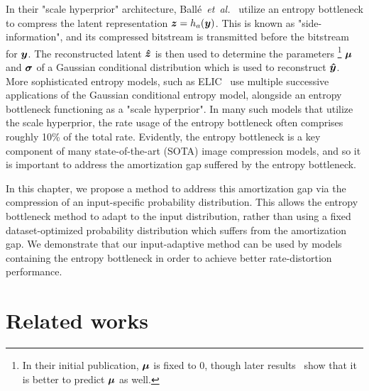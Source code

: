 In their "scale hyperprior" architecture, Ballé~\emph{et~al.}~\cite{balle2018variational} utilize an entropy bottleneck to compress the latent representation ${\boldsymbol{z}} = h_a({\boldsymbol{y}})$.
This is known as "side-information", and its compressed bitstream is transmitted before the bitstream for ${\boldsymbol{y}}$.
The reconstructed latent ${\boldsymbol{\hat{z}}}$ is then used to determine the parameters%
\footnote{In their initial publication, ${\boldsymbol{\mu}}$ is fixed to $0$, though later results~\cite{minnen2018joint} show that it is better to predict ${\boldsymbol{\mu}}$ as well.}
${\boldsymbol{\mu}}$ and ${\boldsymbol{\sigma}}$ of a Gaussian conditional distribution which is used to reconstruct ${\boldsymbol{\hat{y}}}$.
More sophisticated entropy models, such as ELIC~\cite{he2022elic} use multiple successive applications of the Gaussian conditional entropy model, alongside an entropy bottleneck functioning as a "scale hyperprior".
In many such models that utilize the scale hyperprior, the rate usage of the entropy bottleneck often comprises roughly 10\% of the total rate.
Evidently, the entropy bottleneck is a key component of many state-of-the-art (SOTA) image compression models, and so it is important to address the amortization gap suffered by the entropy bottleneck.

In this chapter, we propose a method to address this amortization gap via the compression of an input-specific probability distribution. %
This allows the entropy bottleneck method to adapt to the input distribution, rather than using a fixed dataset-optimized probability distribution which suffers from the amortization gap.
We demonstrate that our input-adaptive method can be used by models containing the entropy bottleneck in order to achieve better rate-distortion performance.





\section{Related works}
\label{sec:pdf_compression/related}

%
%
%
%


